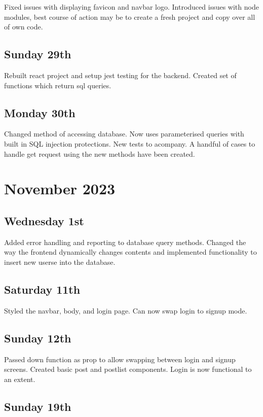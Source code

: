 \documentclass[]{final_report}
\begin{document}
Fixed issues with displaying favicon and navbar logo. Introduced issues with node modules, best course of action may be to create a fresh project and copy over all of own code.

\subsection{Sunday 29th} 

Rebuilt react project and setup jest testing for the backend. Created set of functions which return sql queries.

\subsection{Monday 30th} 

Changed method of accessing database. Now uses parameterised queries with built in SQL injection protections. New tests to acompany. A handful of cases to handle get request using the new methods have been created.

\section{November 2023} 

\subsection{Wednesday 1st} 

Added error handling and reporting to database query methods. Changed the way the frontend dynamically changes contents and implemented functionality to insert new userse into the database.

\subsection{Saturday 11th} 

Styled the navbar, body, and login page. Can now swap login to signup mode.

\subsection{Sunday 12th} 

Passed down function as prop to allow swapping between login and signup screens. Created basic post and postlist components. Login is now functional to an extent.

\subsection{Sunday 19th} 
\end{document}
